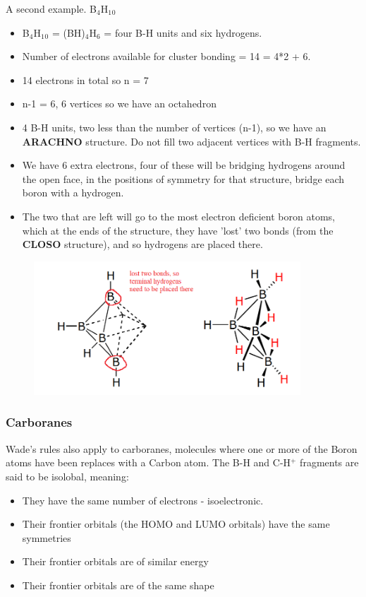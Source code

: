 \documentclass{article}
\renewcommand{\sup}[1]{\(^#1\)}
\newcommand{\sub}[1]{\(_#1\)}
\begin{document}
    A second example. B\sub{4}H\sub{1}\sub{0}
    
    \begin{itemize}
        \item B\sub{4}H\sub{1}\sub{0} = (BH)\sub{4}H\sub{6} = four B-H units and six hydrogens.
        \item Number of electrons available for cluster bonding = 14 = 4*2 + 6.
        \item 14 electrons in total so n = 7
        \item n-1 = 6, 6 vertices so we have an octahedron
        \item 4 B-H units, two less than the number of vertices (n-1), so we have an \textbf{ARACHNO} structure. Do not fill two adjacent vertices with B-H fragments.
        \item We have 6 extra electrons, four of these will be bridging hydrogens around the open face, in the positions of symmetry for that structure, bridge each boron with a hydrogen. 
        \item The two that are left will go to the most electron deficient boron atoms, which at the ends of the structure, they have 'lost' two bonds (from the \textbf{CLOSO} structure), and so hydrogens are placed there.
    \end{itemize}

    \begin{figure}[h]
        \centering
        \includegraphics[width=10cm]{term.png}
    \end{figure}

    \newpage

    \subsubsection{Carboranes}
    Wade's rules also apply to carboranes, molecules where one or more of the Boron atoms have been replaces with a Carbon atom.
    The B-H and C-H\sup{+} fragments are said to be isolobal, meaning:
    \begin{itemize}
        \item They have the same number of electrons - isoelectronic.
        \item Their frontier orbitals (the HOMO and LUMO orbitals) have the same symmetries
        \item Their frontier orbitals are of similar energy
        \item Their frontier orbitals are of the same shape 
    \end{itemize}
\end{document}
